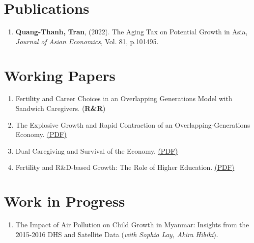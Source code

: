 \section{\sc Publications}
\begin{enumerate}
\item
  {\bf Quang-Thanh, Tran},
  (2022).
  {The Aging Tax on Potential Growth in Asia},
  {\it Journal of Asian Economics}, Vol. 81, p.101495.
\end{enumerate}

\section{\sc Working Papers}
\begin{enumerate}
  \item Fertility and Career Choices in an Overlapping Generations Model with Sandwich Caregivers. (\textbf{R\&R})
  \item The Explosive Growth and Rapid Contraction of an Overlapping-Generations Economy. \href{https://www.dropbox.com/scl/fi/a7b1vnmypehibjmd2wim4/main_rapidcontraction.pdf?rlkey=t3aoep2iiy7shjmpq9cp6tuz3&st=b5jwqdqg&dl=0}{(PDF)}
  \item Dual Caregiving and Survival of the Economy. \href{https://www.dropbox.com/scl/fi/s00pcg0017vtyeb364hlc/main_dualcare-copy.pdf?rlkey=koecpcdaoeroijigjm5x4dtzv&st=6rnfdie5&dl=0}{(PDF)}
  \item Fertility and R\&D-based Growth: The Role of Higher Education. \href{https://www.dropbox.com/scl/fi/6bkvc2vxrbst1iwocxwdl/main_overedu.pdf?rlkey=v59fcybxfcd105y2ciassjttn&st=ym5ntxq0&dl=0}{(PDF)}
\end{enumerate}

\section{\sc Work in Progress}
\begin{enumerate}
  \item The Impact of Air Pollution on Child Growth in Myanmar: Insights from the 2015-2016 DHS and Satellite Data (\textit{with Sophia Lay, Akira Hibiki}).
\end{enumerate}


